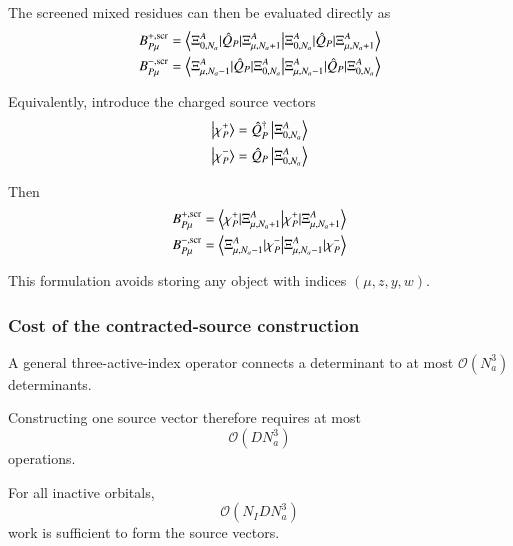 \documentclass[aip,jcp,reprint,noshowkeys,superscriptaddress]{revtex4-1}
\begin{document}
The screened mixed residues can then be evaluated directly as
\begin{subequations}
  \label{eq:B-source-form}
  \begin{align}
    B_{P\mu}^{+,{\rm scr}}
    &=
    \braket{
      \Xi_{0,N_a}^A
      |
      \hat Q_P
      |
      \Xi_{\mu,N_a+1}^A
    }
    \\
    B_{P\mu}^{-,{\rm scr}}
    &=
    \braket{
      \Xi_{\mu,N_a-1}^A
      |
      \hat Q_P
      |
      \Xi_{0,N_a}^A
    }
  \end{align}
\end{subequations}

Equivalently, introduce the charged source vectors
\begin{subequations}
  \begin{align}
    \ket{\chi_P^+}
    &=
    \hat Q_P^\dagger
    \ket{\Xi_{0,N_a}^A}
    \\
    \ket{\chi_P^-}
    &=
    \hat Q_P
    \ket{\Xi_{0,N_a}^A}
  \end{align}
\end{subequations}

Then
\begin{subequations}
  \begin{align}
    B_{P\mu}^{+,{\rm scr}}
    &=
    \braket{
      \chi_P^+
      |
      \Xi_{\mu,N_a+1}^A
    }
    \\
    B_{P\mu}^{-,{\rm scr}}
    &=
    \braket{
      \Xi_{\mu,N_a-1}^A
      |
      \chi_P^-
    }
  \end{align}
\end{subequations}

This formulation avoids storing any object with indices
$(\mu,z,y,w)$.


\subsubsection{Cost of the contracted-source construction}

A general three-active-index operator connects a determinant to at most
$\mathcal O(N_a^3)$ determinants.

Constructing one source vector therefore requires at most
\begin{equation}
  \mathcal O(DN_a^3)
\end{equation}
operations.

For all inactive orbitals,
\begin{equation}
  \mathcal O(N_I DN_a^3)
\end{equation}
work is sufficient to form the source vectors.
\end{document}
